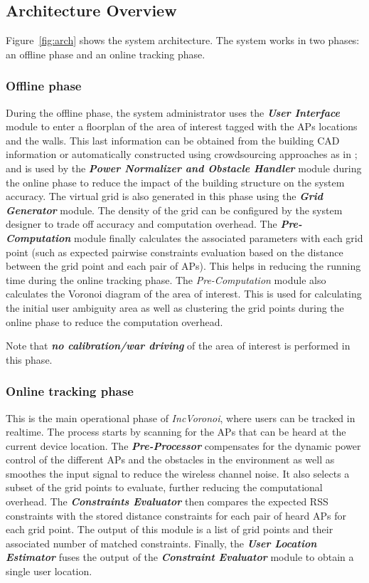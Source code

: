\documentclass[conference]{IEEEtran}
\def \sys {\textit{IncVoronoi}}
\begin{document}
\subsection{Architecture Overview}
Figure~\ref{fig:arch} shows the system architecture. The system works in two phases: an offline phase and an online tracking phase.

\subsubsection{Offline phase} During the offline phase, the system administrator uses the \textbf{\emph{User Interface}} module to enter a floorplan of the area of interest tagged with the APs locations and the walls. This last information can be obtained from the building CAD information or automatically constructed using crowdsourcing approaches as in \cite{crowdinside,elhamshary2014checkinside,elhamshary2015semsense,elhamshary2016transitlabel}; and is used by the \textbf{\emph{Power Normalizer and Obstacle Handler}} module during the online phase to reduce the impact of the building structure on the system accuracy. The virtual grid is also generated in this phase using the \textbf{\emph{Grid Generator}} module. The density of the grid can be configured by the system designer to trade off accuracy and computation overhead. The \textbf{\emph{Pre-Computation}} module finally calculates the associated parameters with each grid point (such as expected pairwise constraints evaluation based on the distance between the grid point and each pair of APs). This helps in reducing the running time during the online tracking phase. The \emph{Pre-Computation} module also calculates the Voronoi diagram of the area of interest. This is used for calculating the initial user ambiguity area as well as clustering the grid points during the online phase to reduce the computation overhead.

Note that \textbf{\emph{no calibration/war driving}} of the area of interest is performed in this phase. 
\subsubsection{Online tracking phase}
This is the main operational phase of \sys{}, where users can be tracked in realtime. The process starts by scanning for the APs that can be heard at the current device location. The \textbf{\emph{Pre-Processor}} compensates for the dynamic power control of the different APs and the obstacles in the environment as well as smoothes the input signal to reduce the wireless channel noise. It also selects a subset of the grid points to evaluate, further reducing the computational overhead. The \textbf{\emph{Constraints Evaluator}} then compares the expected RSS constraints with the stored distance constraints for each pair of heard APs for each grid point. The output of this module is a list of grid points and their associated number of matched constraints. Finally, the \emph{\textbf{User Location Estimator}} fuses the output of the \textbf{\emph{Constraint Evaluator}} module to obtain a single user location. 
\end{document}
